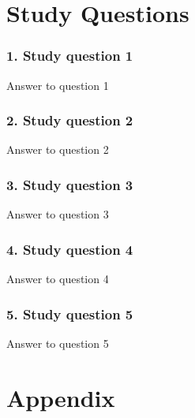 \documentclass[11pt]{article}
\begin{document}
\section*{\textcolor{mycolor}{Study Questions}}
\subsubsection*{\textcolor{mycolor}{1. Study question 1}}
Answer to question 1
\subsubsection*{\textcolor{mycolor}{2. Study question 2}}
Answer to question 2
\subsubsection*{\textcolor{mycolor}{3. Study question 3}}
Answer to question 3
\subsubsection*{\textcolor{mycolor}{4. Study question 4}}
Answer to question 4
\subsubsection*{\textcolor{mycolor}{5. Study question 5}}
Answer to question 5
\section*{\textcolor{mycolor}{Appendix}}
\end{document}

